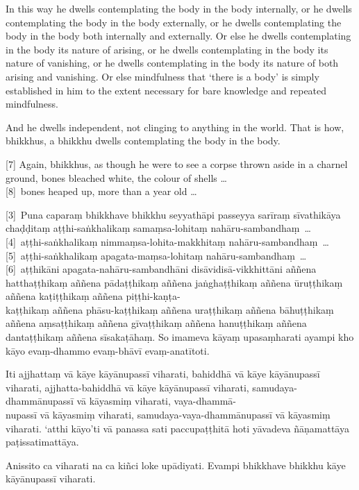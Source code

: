 In this way he dwells contemplating the body in the body internally, or he
dwells contemplating the body in the body externally, or he dwells contemplating
the body in the body both internally and externally. Or else he dwells
contemplating in the body its nature of arising, or he dwells contemplating in
the body its nature of vanishing, or he dwells contemplating in the body its
nature of both arising and vanishing. Or else mindfulness that ‘there is a body’
is simply established in him to the extent necessary for bare knowledge and
repeated mindfulness.

And he dwells independent, not clinging to anything in the world. That is how,
bhikkhus, a bhikkhu dwells contemplating the body in the body.

[7] Again, bhikkhus, as though he were to see a corpse thrown aside in a charnel
ground, bones bleached white, the colour of shells \ldots{}\\
{}[8]~bones heaped up, more than a year old \ldots{}

\paliPage

[3]~Puna caparaṃ bhikkhave bhikkhu seyyathāpi passeyya sarīraṃ
sīvathikāya chaḍḍitaṃ aṭṭhi-saṅkhalikaṃ samaṃsa-lohitaṃ nahāru-sambandhaṃ~\ldots{}\\
{}[4]~aṭṭhi-saṅkhalikaṃ nimmaṃsa-lohita-makkhitaṃ nahāru-sambandhaṃ~\ldots{}\\
{}[5]~aṭṭhi-saṅkhalikaṃ apagata-maṃsa-lohitaṃ nahāru-sambandhaṃ~\ldots{}\\
{}[6]~aṭṭhikāni apagata-nahāru-sambandhāni disāvidisā-vikkhittāni aññena
hatthaṭṭhikaṃ aññena pādaṭṭhikaṃ aññena jaṅghaṭṭhikaṃ aññena ūruṭṭhikaṃ aññena
kaṭiṭṭhikaṃ aññena piṭṭhi-kaṇṭa-\\
kaṭṭhikaṃ aññena phāsu-kaṭṭhikaṃ aññena uraṭṭhikaṃ
aññena bāhuṭṭhikaṃ aññena aṃsaṭṭhikaṃ aññena gīvaṭṭhikaṃ aññena hanuṭṭhikaṃ
aññena dantaṭṭhikaṃ aññena sīsakaṭāhaṃ. So imameva kāyaṃ upasaṃharati ayampi kho
kāyo evaṃ-dhammo evaṃ-bhāvī evaṃ-anatītoti.

Iti ajjhattaṃ vā kāye kāyānupassī viharati, bahiddhā vā kāye kāyānupassī
viharati, ajjhatta-bahiddhā vā kāye kāyānupassī viharati, samudaya-dhammānupassī
vā kāyasmiṃ viharati, vaya-dhammā-\\
nupassī vā kāyasmiṃ viharati, samudaya-vaya-dhammānupassī vā kāyasmiṃ viharati.
`atthi kāyo'ti vā panassa sati paccupaṭṭhitā hoti yāvadeva ñāṇamattāya
paṭissatimattāya.

Anissito ca viharati na ca kiñci loke upādiyati. Evampi bhikkhave bhikkhu kāye
kāyānupassī viharati.


